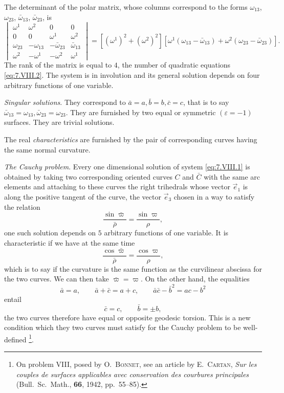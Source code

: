 \documentclass[leqno,11pt]{book}
\numberwithin{equation}{chapter}
\theoremstyle{shape1}
\theoremstyle{shape0}
\theoremstyle{shape2}
\theoremstyle{definition}
\begin{document}
The determinant of the polar matrix, whose columns correspond to the forms $\omega_{13}$, $\omega_{23}$, $\bar\omega_{13}$, $\bar\omega_{23}$, is
\begin{equation}
  \label{eq:7.VIII.3}\tag{VIII, 3}
      \begin{vmatrix}
        \omega^{1}&\omega^{2}&0&0\\
        0&0&\omega^{1}&\omega^{2}\\
        \omega_{23}&-\omega_{13}&-\bar\omega_{23}&\bar\omega_{13}\\
        \omega^{2}&-\omega^{1}&-\omega^{2}&\omega^{1}
      \end{vmatrix}
      =[(\omega^{1})^{2}+(\omega^{2})^{2}][\omega^{1}(\omega_{13}-\bar\omega_{13})+\omega^{2}(\omega_{23}-\bar\omega_{23})].
\end{equation}
The rank of the matrix is equal to $4$, the number of quadratic equations \eqref{eq:7.VIII.2}. The system is in involution and its general solution depends on four arbitrary functions of one variable.

\emph{Singular solutions}. They correspond to $\bar a = a,\bar b=b, \bar c=c$, that is to say $\bar \omega_{13}=\omega_{13},\bar\omega_{23}=\omega_{23}$. They are furnished by two equal or symmetric $(\varepsilon=-1)$ surfaces. They are trivial solutions.

The real \emph{characteristics} are furnished by the pair of corresponding curves having the same normal curvature.


\vspace{12pt}\fsec\emph{The Cauchy problem}. Every one dimensional solution of system \eqref{eq:7.VIII.1} is obtained by taking two corresponding oriented curves $C$ and $\bar C$ with the same arc elements and attaching to these curves the right trihedrals whose vector $\vec e_{1}$ is along the positive tangent of the curve, the vector $\vec e_{3}$ chosen in a way to satisfy the relation
\begin{equation}
  \label{eq:7.VIII.4}\tag{VIII, 4}
  \frac{\sin\bar\varpi}{\bar\rho}=\frac{\sin\varpi}{\rho},
\end{equation}
one such solution depends on $5$ arbitrary functions of one variable. It is characteristic if we have at the same time
\begin{equation}
  \label{eq:7.VIII.5}\tag{VIII, 5}
  \frac{\cos\bar\varpi}{\bar\rho}=\frac{\cos\varpi}{\rho},
\end{equation}
which is to say if the curvature is the same function as the curvilinear abscissa for the two curves. 
We can then take $\bar\varpi=\varpi$. On the other hand, the equalities
\[
\bar a=a,\qquad\bar a+\bar c=a+c,\qquad\bar a\bar c-\bar b^{2}=ac-b^{2}
\]
entail
\[
\bar c=c,\qquad\bar b=\pm b,
\]
the two curves therefore have equal or opposite geodesic torsion. This is a new condition which they two curves must satisfy for the Cauchy problem to be well-defined \footnote{On problem VIII, posed by \textsc{O.~Bonnet}, see an article by \textsc{E.~Cartan}, \emph{Sur les couples de surfaces applicables avec conservation des courbures principales} (Bull.~Sc.~Math., \textbf{66}, 1942, pp.~55--85).}.
\end{document}
